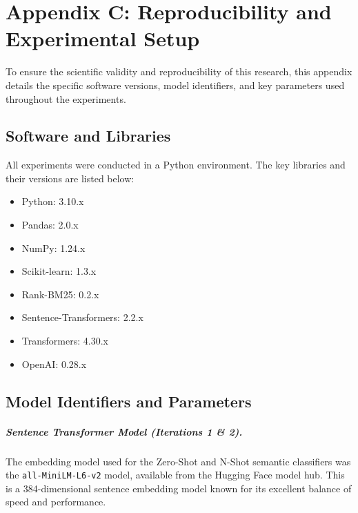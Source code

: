 
\chapter{Appendix C: Reproducibility and Experimental Setup}
\label{app:reproducibility}

To ensure the scientific validity and reproducibility of this research, this appendix details the specific software versions, model identifiers, and key parameters used throughout the experiments.

\section{Software and Libraries}

All experiments were conducted in a Python environment. The key libraries and their versions are listed below:
\begin{itemize}
    \item Python: 3.10.x
    \item Pandas: 2.0.x
    \item NumPy: 1.24.x
    \item Scikit-learn: 1.3.x
    \item Rank-BM25: 0.2.x
    \item Sentence-Transformers: 2.2.x
    \item Transformers: 4.30.x
    \item OpenAI: 0.28.x
\end{itemize}

\section{Model Identifiers and Parameters}

\paragraph{Sentence Transformer Model (Iterations 1 \& 2).}
The embedding model used for the Zero-Shot and N-Shot semantic classifiers was the \texttt{all-MiniLM-L6-v2} model, available from the Hugging Face model hub. This is a 384-dimensional sentence embedding model known for its excellent balance of speed and performance.

